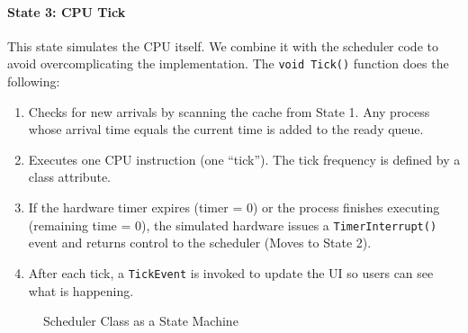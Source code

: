 \documentclass[conference]{IEEEtran}
\begin{document}
\paragraph{State 3: CPU Tick}  

This state simulates the CPU itself. We combine it with the scheduler code to avoid overcomplicating the implementation. The \texttt{void Tick()} function does the following:
\begin{enumerate}
  \item Checks for new arrivals by scanning the cache from State 1. Any process whose arrival time equals the current time is added to the ready queue.
  \item Executes one CPU instruction (one “tick”). The tick frequency is defined by a class attribute.
  \item If the hardware timer expires (timer = 0) or the process finishes executing (remaining time = 0), the simulated hardware issues a \texttt{TimerInterrupt()} event and returns control to the scheduler (Moves to State 2).
  \item After each tick, a \texttt{TickEvent} is invoked to update the UI so users can see what is happening.
\end{enumerate}

\begin{figure}[H]
    \centering
    \caption{Scheduler Class as a State Machine}
    \label{fig:statemachine}
\end{figure}
\end{document}
